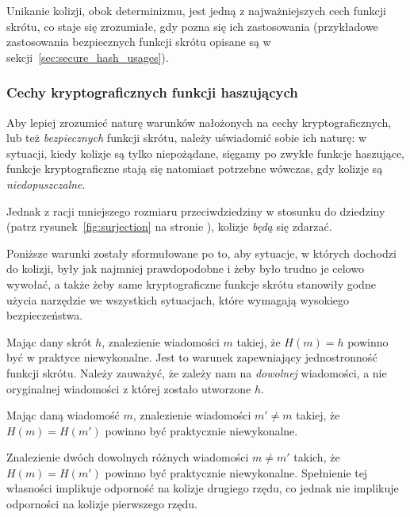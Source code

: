 \documentclass[12pt,a4paper,twoside]{article}
\begin{document}
Unikanie kolizji, obok determinizmu, jest jedną z najważniejszych cech funkcji
skrótu, co staje się zrozumiałe, gdy pozna się ich zastosowania (przykładowe
zastosowania bezpiecznych funkcji skrótu opisane są w
sekcji~\ref{sec:secure_hash_usages}).

\subsubsection{Cechy kryptograficznych funkcji haszujących}
\label{sec:secure_hash_attributes}
Aby lepiej zrozumieć naturę warunków nałożonych na cechy kryptograficznych, lub
też \emph{bezpiecznych} funkcji skrótu, należy uświadomić sobie ich naturę: w
sytuacji, kiedy kolizje są tylko niepożądane, sięgamy po zwykłe funkcje
haszujące, funkcje kryptograficzne stają się natomiast potrzebne wówczas, gdy
kolizje są \emph{niedopuszczalne}.

Jednak z racji mniejszego rozmiaru przeciwdziedziny w stosunku do dziedziny
(patrz rysunek~\ref{fig:surjection} na stronie \pageref{fig:surjection}),
kolizje \emph{będą} się zdarzać.

Poniższe warunki zostały sformułowane po to, aby sytuacje, w których dochodzi
do kolizji, były jak najmniej prawdopodobne i żeby było trudno je celowo
wywołać, a także żeby same kryptograficzne funkcje skrótu stanowiły godne
użycia narzędzie we wszystkich sytuacjach, które wymagają wysokiego
bezpieczeństwa.

\label{sec:preimage_resistance}
Mając dany skrót $h$, znalezienie wiadomości $m$ takiej, że $H(m) = h$ powinno
być w praktyce niewykonalne. Jest to warunek zapewniający jednostronność
funkcji skrótu. Należy zauważyć, że zależy nam na \emph{dowolnej} wiadomości,
a nie oryginalnej wiadomości z której zostało utworzone $h$.

\label{sec:second_preimage_resistance}
Mając daną wiadomość $m$, znalezienie wiadomości $m' \neq m$ takiej, że $H(m)
= H(m')$ powinno być praktycznie niewykonalne.

\label{sec:collision_resistance}
Znalezienie dwóch dowolnych różnych wiadomości $m \neq m'$ takich, że $H(m) =
H(m')$ powinno być praktycznie niewykonalne.
Spełnienie tej własności implikuje odporność na kolizje drugiego rzędu, co
jednak nie implikuje odporności na kolizje pierwszego rzędu.
\end{document}
